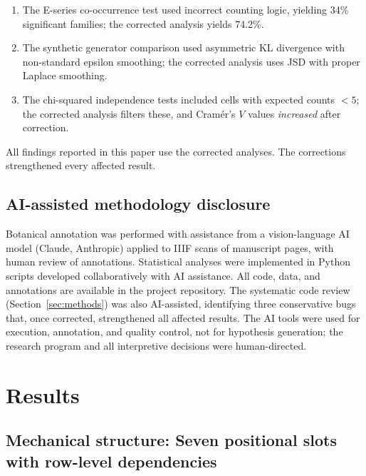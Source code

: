 \documentclass[12pt]{article}
\begin{document}
\begin{enumerate}
  \item The E-series co-occurrence test used incorrect counting logic, yielding 34\% significant families; the corrected analysis yields 74.2\%.
  \item The synthetic generator comparison used asymmetric KL divergence with non-standard epsilon smoothing; the corrected analysis uses JSD with proper Laplace smoothing.
  \item The chi-squared independence tests included cells with expected counts $< 5$; the corrected analysis filters these, and Cram\'{e}r's $V$ values \emph{increased} after correction.
\end{enumerate}

All findings reported in this paper use the corrected analyses. The corrections strengthened every affected result.

\subsection{AI-assisted methodology disclosure}

Botanical annotation was performed with assistance from a vision-language AI model (Claude, Anthropic) applied to IIIF scans of manuscript pages, with human review of annotations. Statistical analyses were implemented in Python scripts developed collaboratively with AI assistance. All code, data, and annotations are available in the project repository. The systematic code review (Section~\ref{sec:methods}) was also AI-assisted, identifying three conservative bugs that, once corrected, strengthened all affected results. The AI tools were used for execution, annotation, and quality control, not for hypothesis generation; the research program and all interpretive decisions were human-directed.

\section{Results}
\label{sec:results}

\subsection{Mechanical structure: Seven positional slots with row-level dependencies}
\label{sec:mechanical}
\end{document}
